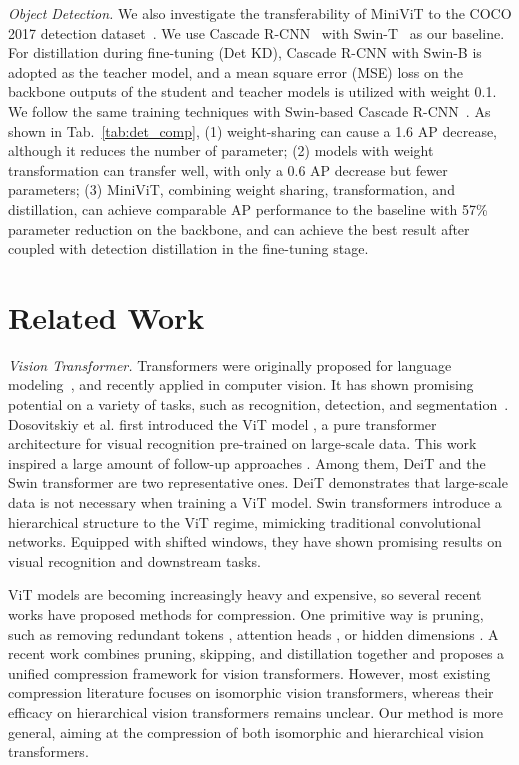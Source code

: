 \documentclass[10pt,twocolumn,letterpaper]{article}
\begin{document}
    \textit{Object Detection.} We also investigate the transferability of MiniViT to the COCO 2017 detection dataset~\cite{coco}. We use Cascade R-CNN~\cite{cascade_rcnn} with Swin-T~\cite{Swin} as our baseline. 
   For distillation during fine-tuning (Det KD), Cascade R-CNN with Swin-B is adopted as the teacher model, and a mean square error (MSE) loss on the backbone outputs of the student and teacher models is utilized with weight 0.1. We follow the same training techniques with Swin-based Cascade R-CNN~\cite{Swin}. As shown in Tab.~\ref{tab:det_comp}, (1) weight-sharing can cause a 1.6 AP decrease, although it reduces the number of parameter; (2) models with weight transformation can transfer well, with only a 0.6 AP decrease but fewer parameters; (3) MiniViT, combining weight sharing, transformation, and distillation, can achieve comparable AP performance to the baseline with 57\% parameter reduction on the backbone, and can achieve the best result after coupled with detection distillation in the fine-tuning stage.

\vspace{-0.2cm}    
\section{Related Work}

\textit{Vision Transformer.} Transformers were originally proposed for language modeling~\cite{vaswani2017attention}, and recently applied in computer vision. It has shown promising potential on a variety of tasks, such as recognition, detection, and segmentation~\cite{DETR, ViT, liang2020polytransform}.
Dosovitskiy et al. first introduced the ViT model \cite{ViT}, a pure transformer architecture for visual
recognition pre-trained on large-scale data.
This work inspired a large amount of follow-up approaches \cite{deit, Swin, CrossViT,T2TViT, han2021transformer}. Among them, DeiT \cite{deit} and the Swin transformer \cite{Swin} are two representative ones. DeiT \cite{deit} demonstrates that large-scale data is not necessary when training a ViT model.
Swin transformers \cite{Swin} introduce a hierarchical structure to the ViT regime, mimicking traditional convolutional networks. Equipped with shifted windows, they have shown promising results on visual recognition and downstream tasks.

ViT models are becoming increasingly heavy and expensive, so several recent works have proposed methods for compression. One primitive way is pruning, such as removing redundant tokens \cite{dynamicvit, IA-RED2}, attention heads \cite{S2VIT}, or hidden dimensions \cite{VTP, nvit}. A recent work \cite{UVTC} combines pruning, skipping, and distillation together and proposes a unified compression framework for vision transformers. However, most existing compression literature focuses on isomorphic vision transformers, whereas their efficacy on hierarchical vision transformers remains unclear. Our method is more general, aiming at the compression of both isomorphic and hierarchical vision transformers.
    
\end{document}
